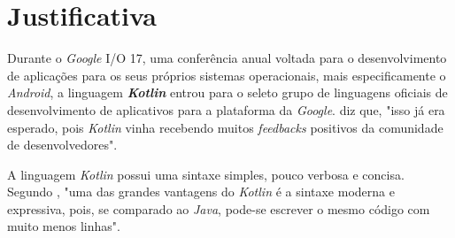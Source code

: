 


\section{Justificativa}

 Durante o \textit{Google} I/O 17, uma conferência anual voltada para o desenvolvimento de aplicações para os seus próprios sistemas operacionais, mais especificamente o \textit{Android}, a linguagem \textbf{\textit{Kotlin}} entrou para o seleto grupo de linguagens oficiais de desenvolvimento de aplicativos para a plataforma da \textit{Google}.   diz que, "isso já era esperado, pois \textit{Kotlin} vinha recebendo muitos \textit{feedbacks} positivos da comunidade de desenvolvedores".

A linguagem \textit{Kotlin} possui uma sintaxe simples, pouco verbosa e concisa. Segundo , "uma das grandes vantagens do \textit{Kotlin} é a sintaxe moderna e expressiva, pois, se comparado ao \textit{Java}, pode-se escrever o mesmo código com muito menos linhas".

